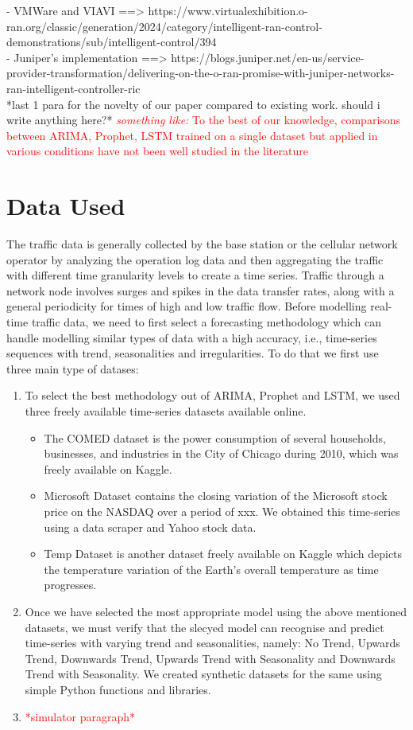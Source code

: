 \documentclass[conference]{IEEEtran}
\begin{document}
- VMWare and VIAVI ==> https://www.virtualexhibition.o-ran.org/classic/generation/2024/category/intelligent-ran-control-demonstrations/sub/intelligent-control/394 \\

- Juniper's implementation ==> https://blogs.juniper.net/en-us/service-provider-transformation/delivering-on-the-o-ran-promise-with-juniper-networks-ran-intelligent-controller-ric \\

*last 1 para for the novelty of our paper compared to existing work. should i write anything here?* \textcolor{red}{\textit{something like: } To the best of our knowledge, comparisons between ARIMA, Prophet, LSTM trained on a single dataset but applied in various conditions have not been well studied in the literature}

\section{Data Used}
The traffic data is generally collected by the base station or the cellular network operator by analyzing the operation log data and then aggregating the traffic with different time granularity levels to create a time series. Traffic through a network node involves surges and spikes in the data transfer rates, along with a general periodicity for times of high and low traffic flow. Before modelling real-time traffic data, we need to first select a forecasting methodology which can handle modelling similar types of data with a high accuracy, i.e., time-series sequences with trend, seasonalities and irregularities. To do that we first use three main type of datases:
\begin{enumerate}
  \item To select the best methodology out of ARIMA, Prophet and LSTM, we used three freely available time-series datasets available online. 
  \begin{itemize}
      \item The COMED dataset is the power consumption of several households, businesses, and industries in the City of Chicago during 2010, which was freely available on Kaggle.
      \item Microsoft Dataset contains the closing variation of the Microsoft stock price on the NASDAQ over a period of xxx. We obtained this time-series using a data scraper and Yahoo stock data. 
      \item Temp Dataset is another dataset freely available on Kaggle which depicts the temperature variation of the Earth’s overall temperature as time progresses. 
    \end{itemize}
  \item Once we have selected the most appropriate model using the above mentioned datasets, we must verify that the slecyed model can recognise and predict time-series with varying trend and seasonalities, namely: No Trend, Upwards Trend, Downwards Trend, Upwards Trend with Seasonality and Downwards Trend with Seasonality. We created synthetic datasets for the same using simple Python functions and libraries. 
\item \textcolor{red}{*simulator paragraph*}
\end{enumerate}
\end{document}
